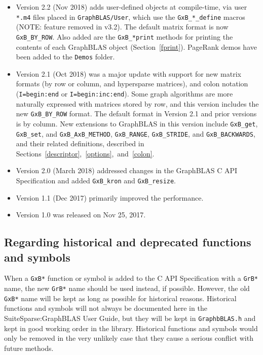 \documentclass[12pt]{article}
\begin{document}
\begin{itemize}
\item
Version 2.2 (Nov 2018)
adds user-defined objects at compile-time, via user \verb'*.m4' files placed in
\verb'GraphBLAS/User', which use the \verb'GxB_*_define' macros 
(NOTE: feature removed in v3.2).
The default matrix format is now \verb'GxB_BY_ROW'.
Also added are the \verb'GxB_*print' methods for printing the contents of each
GraphBLAS object (Section~\ref{fprint}).   PageRank demos have been added to
the \verb'Demos' folder.

\item
Version 2.1 (Oct 2018) was
a major update with support for new matrix formats
(by row or column, and hypersparse matrices), and colon notation
(\verb'I=begin:end' or \verb'I=begin:inc:end').  Some graph algorithms are more
naturally expressed with matrices stored by row, and this version includes the
new \verb'GxB_BY_ROW' format.  The default format in Version 2.1 and
prior versions is by column.
New extensions to GraphBLAS in this version include \verb'GxB_get',
\verb'GxB_set', and \verb'GxB_AxB_METHOD', \verb'GxB_RANGE', \verb'GxB_STRIDE',
and \verb'GxB_BACKWARDS', and their related definitions, described in
Sections~\ref{descriptor},~\ref{options},~and~\ref{colon}.

\item
Version 2.0 (March 2018) addressed changes in the GraphBLAS C API
Specification and added \verb'GxB_kron' and \verb'GxB_resize'.

\item
Version 1.1 (Dec 2017) primarily improved the performance.

\item
Version 1.0 was released on Nov 25, 2017.
\end{itemize}

\subsection{Regarding historical and deprecated functions and symbols}

When a \verb'GxB*' function or symbol is added to the C API Specification with
a \verb'GrB*' name, the new \verb'GrB*' name should be used instead, if
possible.  However, the old \verb'GxB*' name will be kept as long as possible
for historical reasons.  Historical functions and symbols will not always be
documented here in the SuiteSparse:GraphBLAS User Guide, but they will be kept
in \verb'GraphbBLAS.h' and kept in good working order in the library.
Historical functions and symbols would only be removed in the very unlikely
case that they cause a serious conflict with future methods.
\end{document}
